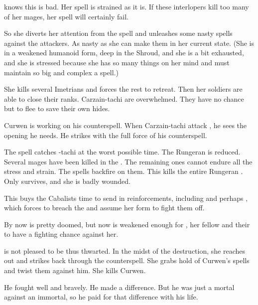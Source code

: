 \Takestsha knows this is bad.
Her spell is strained as it is.
If these interlopers kill too many of her mages, her spell will certainly fail. 

So she diverts her attention from the spell and unleashes some nasty spells against the attackers.
As nasty as she can make them in her current state. 
(She is in a weakened humanoid form, deep in the Shroud, and she is a bit exhausted, and she is stressed because she has so many things on her mind and must maintain so big and complex a spell.)

She kills several Imetrians and forces the rest to retreat.
Then her soldiers are able to close their ranks.
Carzain-tachi are overwhelmed.
They have no chance but to flee to save their own hides. 





\begin{comment}
  \subsection{The \EreshKali magic backfires}
\end{comment}
\new
{}
Curwen is working on his counterspell.
When Carzain-tachi attack \Takestsha, he sees the opening he needs. 
He strikes with the full force of his counterspell. 

The spell catches \Takestsha-tachi at the worst possible time. 
The Rungeran \ishrah is reduced. 
Several mages have been killed in the . 
The remaining ones cannot endure all the stress and strain.
The \EreshKali spells backfire on them. 
This kills the entire Rungeran \ishrah{}.
Only \Takestsha survives, and she is badly wounded. 

This buys the Cabalists time to send in reinforcements, including \banes{} and perhaps \resphain, which forces \Nzessuacrith{} to breach the \charade{} and assume her \draconic{} form to fight them off. 

By now \Forclin{} is pretty doomed, but now \Nzessuacrith{} is weakened enough for \Achsah{}, her fellow \resphain{} and their  to have a fighting chance against her. 





\begin{comment}
  \subsection{Curwen dies}
\end{comment}
\new
{}
\Takestsha is not pleased to be thus thwarted. 
In the midst of the destruction, she reaches out and strikes back through the counterspell.
She grabs hold of Curwen's spells and twist them against him.
She kills Curwen.

He fought well and bravely.
He made a difference.
But he was just a mortal against an immortal, so he paid for that difference with his life. 











